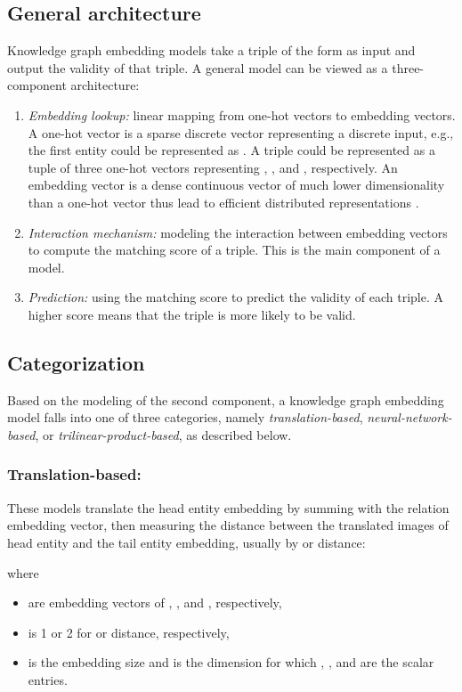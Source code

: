 \documentclass[sigconf,edbt]{acmart-edbt2019}
\begin{document}
\subsection{General architecture}
Knowledge graph embedding models take a triple of the form  as input and output the validity of that triple. A general model can be viewed as a three-component architecture: 
\begin{enumerate}
	\item \textit{Embedding lookup:} linear mapping from one-hot vectors to embedding vectors. A one-hot vector is a sparse discrete vector representing a discrete input, e.g., the first entity could be represented as . A triple could be represented as a tuple of three one-hot vectors representing , , and , respectively. An embedding vector is a dense continuous vector of much lower dimensionality than a one-hot vector thus lead to efficient distributed representations \cite{hinton_learningdistributedrepresentations_1986} \cite{hinton_distributedrepresentations_1984}.
	\item \textit{Interaction mechanism:} modeling the interaction between embedding vectors to compute the matching score of a triple. This is the main component of a model.
	\item \textit{Prediction:} using the matching score to predict the validity of each triple. A higher score means that the triple is more likely to be valid.
\end{enumerate}

\subsection{Categorization}
Based on the modeling of the second component, a knowledge graph embedding model falls into one of three categories, namely \textit{translation-based}, \textit{neural-network-based}, or \textit{trilinear-product-based}, as described below.

\subsubsection{Translation-based:} These models translate the head entity embedding by summing with the relation embedding vector, then measuring the distance between the translated images of head entity and the tail entity embedding, usually by  or  distance:

where 
\begin{itemize}
	\item  are embedding vectors of , , and , respectively,
	\item  is 1 or 2 for  or  distance, respectively,
	\item  is the embedding size and  is the dimension for which , , and  are the scalar entries.
\end{itemize}
\end{document}
